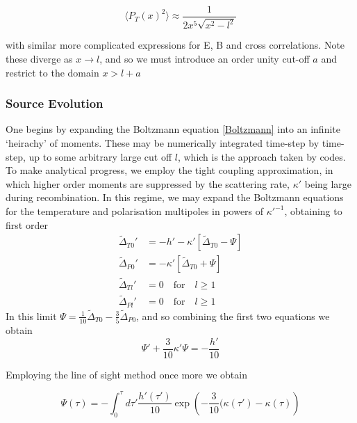 \documentclass[a4paper,10pt]{article}
\begin{document}
\begin{equation}
\langle P_T(x)^2 \rangle \approx \frac{1}{2x^5\sqrt{x^2-l^2}}
\end{equation}

with similar more complicated expressions for E, B and cross correlations. Note these diverge as $x\rightarrow l$, and so we must introduce an order unity cut-off $a$ and restrict to the domain $x>l+a$





\subsubsection{Source Evolution}

One begins by expanding the Boltzmann equation \ref{Boltzmann} into an infinite `heirachy' of moments. These may be numerically integrated time-step by time-step, up to some arbitrary large cut off $l$, which is the approach taken by codes. To make analytical progress, we employ the tight coupling approximation, in which higher order moments are suppressed by the scattering rate, $\kappa'$ being large during recombination. In this regime, we may expand the Boltzmann equations for the temperature and polarisation multipoles in powers of $\kappa'^{-1}$, obtaining to first order
\begin{equation}
\begin{split}
\tilde{\Delta}_{T0}'&=-h'-\kappa'[\tilde{\Delta}_{T0}-\Psi]\\
\tilde{\Delta}_{P0}'&=-\kappa'[\tilde{\Delta}_{T0}+\Psi]\\
\tilde{\Delta}_{Tl}'&=0\quad\text{for} \quad l\geq1\\
\tilde{\Delta}_{Pl}'&=0\quad\text{for} \quad l\geq1
\end{split}
\end{equation}
In this limit $\Psi = \frac{1}{10}\tilde{\Delta}_{T0} - \frac{3}{5}\tilde{\Delta}_{P0}$, and so combining the first two equations we obtain
\begin{equation}
\Psi ' +\frac{3}{10}\kappa'\Psi = -\frac{h'}{10}
\end{equation}

Employing the line of sight method once more we obtain

\begin{equation}
\Psi(\tau) = -\int_0^\tau d\tau' \frac{h'(\tau')}{10}\exp{\left( -\frac{3}{10}(\kappa(\tau')-\kappa(\tau)\right)}
\end{equation}
\end{document}
